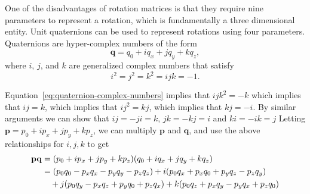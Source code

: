 One of the disadvantages of rotation matrices is that they require nine parameters to represent a rotation, which is fundamentally a three dimensional entity.  Unit quaternions can be used to represent rotations using four parameters.  
Quaternions are hyper-complex numbers of the form 
\[
\mathbf{q} = q_0 + i q_x + j q_y + k q_z,
\]
where $i$, $j$, and $k$ are generalized complex numbers that satisfy 
\begin{equation}\label{eq:quaternion-complex-numbers}
i^2 = j^2 = k^2 = ijk = -1.
\end{equation}

Equation~\eqref{eq:quaternion-complex-numbers} implies that $ijk^2=-k$ which implies that $ij=k$, which implies that $ij^2=kj$, which implies that $kj=-i$.  
By similar arguments we can show that $ij=-ji=k$, $jk=-kj=i$ and $ki=-ik=j$
Letting $\mathbf{p}=p_0 + ip_x + jp_y + kp_z$, we can multiply $\mathbf{p}$ and $\mathbf{q}$, and use the above relationships for $i, j, k$ to get
\begin{align}
\mathbf{p}\mathbf{q} &= (p_0 + ip_x + jp_y + kp_z)(q_0 + i q_x + j q_y + k q_z) \notag \\
&= (p_0q_0-p_xq_x-p_yq_y-p_zq_z) 
	+i(p_0q_x + p_xq_0 + p_yq_z - p_zq_y)
\\ &\quad
	+j(p_0q_y - p_xq_z + p_yq_0 + p_zq_x)
	+k(p_0q_z + p_xq_y - p_yq_x + p_zq_0)
\label{eq:quaternion-product-pre}
\end{align}

